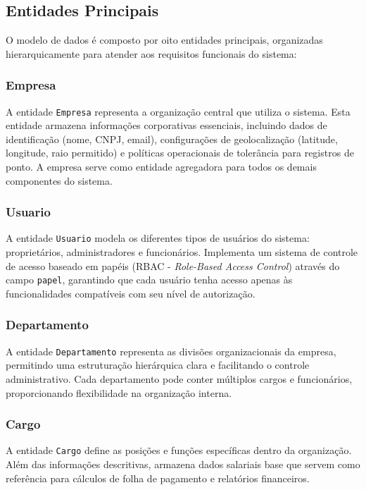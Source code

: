\subsection{Entidades Principais}

O modelo de dados é composto por oito entidades principais, organizadas hierarquicamente para atender aos requisitos funcionais do sistema:

\subsubsection{Empresa}

A entidade \texttt{Empresa} representa a organização central que utiliza o sistema. Esta entidade armazena informações corporativas essenciais, incluindo dados de identificação (nome, CNPJ, email), configurações de geolocalização (latitude, longitude, raio permitido) e políticas operacionais de tolerância para registros de ponto. A empresa serve como entidade agregadora para todos os demais componentes do sistema.

\subsubsection{Usuario}

A entidade \texttt{Usuario} modela os diferentes tipos de usuários do sistema: proprietários, administradores e funcionários. Implementa um sistema de controle de acesso baseado em papéis (RBAC - \textit{Role-Based Access Control}) através do campo \texttt{papel}, garantindo que cada usuário tenha acesso apenas às funcionalidades compatíveis com seu nível de autorização.

\subsubsection{Departamento}

A entidade \texttt{Departamento} representa as divisões organizacionais da empresa, permitindo uma estruturação hierárquica clara e facilitando o controle administrativo. Cada departamento pode conter múltiplos cargos e funcionários, proporcionando flexibilidade na organização interna.

\subsubsection{Cargo}

A entidade \texttt{Cargo} define as posições e funções específicas dentro da organização. Além das informações descritivas, armazena dados salariais base que servem como referência para cálculos de folha de pagamento e relatórios financeiros.

